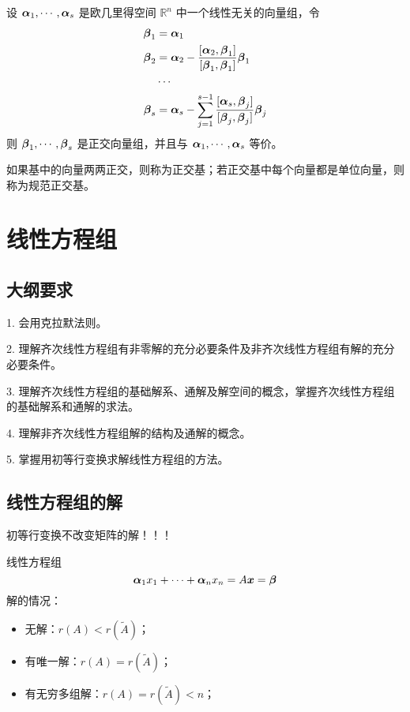 \begin{theorem}
	设 $\boldsymbol{\alpha}_1,\cdots,\boldsymbol{\alpha}_s$ 是欧几里得空间 $\mathbb{R}^n$ 中一个线性无关的向量组，令
	\[
		\begin{aligned}
			\boldsymbol{\beta}_1 & =\boldsymbol{\alpha}_1                                                                                                    \\
			\boldsymbol{\beta}_2 & =\boldsymbol{\alpha}_2 - \frac{[\boldsymbol{\alpha}_2,\boldsymbol{\beta}_1]}{[\boldsymbol{\beta}_1,\boldsymbol{\beta}_1]}\boldsymbol{\beta}_1                \\
			              & \cdots                                                                                                             \\
			\boldsymbol{\beta}_s & = \boldsymbol{\alpha}_s-\sum_{j=1}^{s-1}\frac{[\boldsymbol{\alpha}_s,\boldsymbol{\beta}_j]}{[\boldsymbol{\beta}_j,\boldsymbol{\beta}_j]}\boldsymbol{\beta}_j
		\end{aligned}
	\]
	则 $\boldsymbol{\beta}_1,\cdots,\boldsymbol{\beta}_s$ 是正交向量组，并且与 $\boldsymbol{\alpha}_1,\cdots,\boldsymbol{\alpha}_s$ 等价。
\end{theorem}

如果基中的向量两两正交，则称为正交基；若正交基中每个向量都是单位向量，则称为规范正交基。

\section{线性方程组}

\subsection{大纲要求}

1. 会用克拉默法则。

2. 理解齐次线性方程组有非零解的充分必要条件及非齐次线性方程组有解的充分必要条件。

3. 理解齐次线性方程组的基础解系、通解及解空间的概念，掌握齐次线性方程组的基础解系和通解的求法。

4. 理解非齐次线性方程组解的结构及通解的概念。

5. 掌握用初等行变换求解线性方程组的方法。

\subsection{线性方程组的解}

初等行变换不改变矩阵的解！！！

线性方程组
\[ \boldsymbol{\alpha}_1x_1 + \cdots + \boldsymbol{\alpha}_nx_n = A \boldsymbol{x} = \boldsymbol{\beta} \]
解的情况：
\begin{itemize}
	\item 无解：$r(A) < r(\widetilde{A})$；
	\item 有唯一解：$r(A) = r(\widetilde{A})$；
	\item 有无穷多组解：$r(A) = r(\widetilde{A}) < n$；
\end{itemize}


